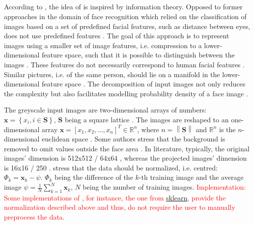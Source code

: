\subsection{\eigenfaces{}}\label{subsec:eigenface}

According to \citeauthor{eigenfaces1991}, the idea of \eigenfaces{} is inspired by information theory.
Opposed to former approaches in the domain of face recognition which relied on the classification of images based on a set of predefined facial features, such as distance between eyes,
\eigenfaces{} does not use predefined features \cite{eigenfaces1991}.
The goal of this approach is to represent images using a smaller set of image features, i.e. compression to a lower-dimensional feature space, 
such that it is possible to distinguish between the images \cite{eigenfaces1991, eigenfaces2013}.
These features do not necessarily correspond to human facial features \cite{eigenfaces1991}.
Similar pictures, i.e. of the same person, should lie on a manifold in the lower-dimensional feature space \cite{face-recognition2008}.
The decomposition of input images not only reduces the complexity but also facilitates modelling probability density of a face image \cite{face-recognition2008}.

The greyscale input images are two-dimensional arrays of numbers: $\textbf{x} = \left\{ x_i, i \in \textbf{S} \right\}$, $\textbf{S}$ being a square lattice \cite{eigenfaces1997, eigenfaces1991}.
The images are reshaped to an one-dimensional array $\textbf{x} = \left[x_1, x_2, ..., x_n  \right]^{T} \in \mathbb{R}^{n}$, 
where $n = \left\| \textbf{S} \right\|$ and $\mathbb{R}^{n}$ is the $n$-dimensional euclidean space \cite{eigenfaces1997}.
Some authors stress that the background is removed to omit values outside the face area \cite{eigenfaces1991}.
In literature, typically, the original images' dimension is 512x512 \cite{eigenfaces1991}/ 64x64 \cite{face-recognition2020}, 
whereas the projected images' dimension is 16x16 \cite{eigenfaces1991}/ 250 \cite{face-recognition2020}.
\citeauthor{eigenfaces1991} stress that the data should be normalized, i.e. centred: 
$\Phi_{k} = \mathbf{x}_{k} - {\psi }$. 
$\Phi_{k}$ being the difference of the $k$-th training image and the average image $\psi = \frac{1}{N}\sum_{k=1}^{N}\textbf{x}_{k}$, $N$ being the number of training images.
\textcolor{red}{Implementation: Some implementations of \eigenfaces{}, for instance, the one from \href{https://scikit-learn.org/stable/modules/generated/sklearn.decomposition.PCA.html}{sklearn}, 
provide the normalization described above and thus, do not require the user to manually preprocess the data.}



